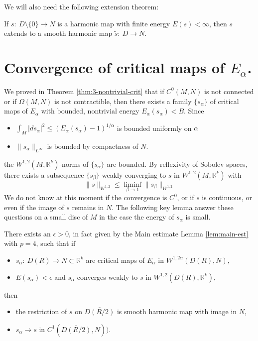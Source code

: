 We will also need the following extension theorem:

\begin{theorem}
\label{thm:extension-sacks-uhlenbeck}
If \(s:\ D\setminus \{0\} \longrightarrow N\) is a harmonic map with finite energy \(E(s) < \infty\), then \(s\) extends to a smooth harmonic map \(\tilde s:\ D \longrightarrow N\).
\end{theorem}



\section{Convergence of critical maps of \(E_{\alpha}\).}
\label{sec:org42be906}

We proved in Theorem \ref{thm:3-nontrivial-crit} that if \(C^0(M,N)\) is not connected or
if \(\Omega(M,N)\) is not contractible, then there exists a family \(\{s_\alpha\}\) of
critical maps  of \(E_\alpha\) with bounded, nontrivial energy \(E_\alpha(s_\alpha) < B\). Since 
\begin{itemize}
\item \(\int_M |ds_\alpha|^2 \leq \left(E_\alpha(s_\alpha)-1\right)^{1/\alpha}\) is bounded
uniformly on \(\alpha\)
\item \(\|s_\alpha\|_{L^\infty}\) is bounded by compactness of \(N\).
\end{itemize}
the \(W^{1,2}(M, \mathbb{R}^k)\)-norms of \(\{s_\alpha\}\) are bounded. By
reflexivity of Sobolev spaces, there exists a subsequence \(\{s_\beta\}\) weakly
converging to \(s\) in \(W^{1,2}(M,\mathbb{R}^k)\) with
\[
\|s\|_{W^{1,2}}\leq \liminf_{\beta\to 1} \|s_\beta\|_{W^{1,2}}
\]
We do not know at this moment if the convergence is \(C^0\), or if \(s\) is
continuous, or even if the image of \(s\) remains in \(N\). The following key lemma
answer these questions on a small disc of \(M\) in the case the energy of \(s_\alpha\)
is small.

\begin{lemma}[Key]
\label{lem:key-sacks-uhlenbeck}
There exists an \(\epsilon>0\), in fact given by the Main estimate Lemma \ref{lem:main-est} with
\(p=4\), such that if
\begin{itemize}
\item \(s_\alpha:\ D(R) \longrightarrow N\subset \mathbb{R}^k\) are critical maps of \(E_\alpha\) in \(W^{1, 2\alpha}(D(R),N)\),
\item \(E(s_\alpha) < \epsilon\) and \(s_\alpha\) converges weakly to \(s\) in \(W^{1,2}(D(R),\mathbb{R}^k)\),
\end{itemize}
then 
\begin{itemize}
\item the restriction of \(s\) on \(\overline{D(R/2)}\) is smooth harmonic map with image in \(N\),
\item \(s_\alpha \to s\) in \(C^1(\overline{D(R/2)},N))\).
\end{itemize}
\end{lemma}

